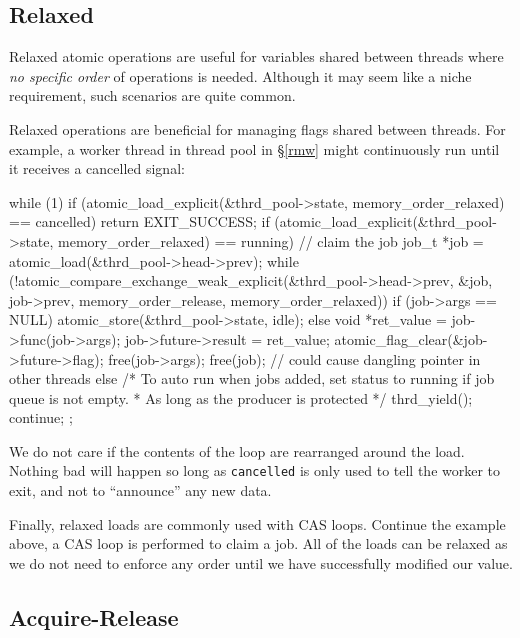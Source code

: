 \documentclass[fontsize=10pt, oneside]{scrartcl}
\newcommand{\secref}[1]{\hyperref[#1]{\textsc{\S}\ref*{#1}}}
\begin{document}
\subsection{Relaxed}
Relaxed atomic operations are useful for variables shared between threads where \emph{no specific order} of operations is needed.
Although it may seem like a niche requirement, such scenarios are quite common.

Relaxed operations are beneficial for managing flags shared between threads.
For example, a worker thread in thread pool in \secref{rmw} might continuously run until it receives a cancelled signal:
\begin{cppcode}
while (1) {
    if (atomic_load_explicit(&thrd_pool->state, memory_order_relaxed) == cancelled)
        return EXIT_SUCCESS;
    if (atomic_load_explicit(&thrd_pool->state, memory_order_relaxed) == running) {
        // claim the job
        job_t *job = atomic_load(&thrd_pool->head->prev);
        while (!atomic_compare_exchange_weak_explicit(&thrd_pool->head->prev, &job,
                                               job->prev, memory_order_release, 
                                               memory_order_relaxed)) {
        }
        if (job->args == NULL) {
            atomic_store(&thrd_pool->state, idle);
        } else {
            void *ret_value = job->func(job->args);
            job->future->result = ret_value;
            atomic_flag_clear(&job->future->flag);
            free(job->args);
            free(job); // could cause dangling pointer in other threads
        }
    } else {
        /* To auto run when jobs added, set status to running if job queue is not empty.
         * As long as the producer is protected */
        thrd_yield();
        continue;
    }
};
\end{cppcode}
We do not care if the contents of the loop are rearranged around the load.
Nothing bad will happen so long as \texttt{cancelled} is only used to tell the worker to exit, and not to ``announce'' any new data.

Finally, relaxed loads are commonly used with \textsc{CAS} loops.
Continue the example above,
a \textsc{CAS} loop is performed to claim a job.
All of the loads can be relaxed as we do not need to enforce any order until we have successfully modified our value.

\subsection{Acquire-Release}
\end{document}
